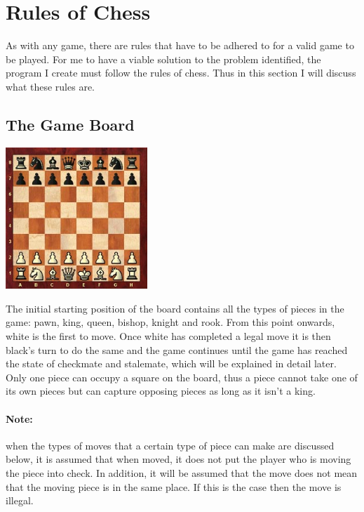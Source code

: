 \documentclass[]{report}
\begin{document}
\section{Rules of Chess}
As with any game, there are rules that have to be adhered to for a valid game to be played. For me to have a viable solution to the problem identified, the program I create must follow the rules of chess. Thus in this section I will discuss what these rules are.
\subsection{The Game Board}
\begin{center}
	\includegraphics[width=0.4\textwidth]{images/boards/initial_board}
\end{center}
The initial starting position of the board contains all the types of pieces in the game: pawn, king, queen, bishop, knight and rook. From this point onwards, white is the first to move. Once white has completed a legal move it is then black’s turn to do the same and the game continues until the game has reached the state of checkmate and stalemate, which will be explained in detail later. Only one piece can occupy a square on the board, thus a piece cannot take one of its own pieces but can capture opposing pieces as long as it isn’t a king.

\paragraph{Note:}when the types of moves that a certain type of piece can make are discussed below, it is assumed that when moved, it does not put the player who is moving the piece into check. In addition, it will be assumed that the move does not mean that the moving piece is in the same place. If this is the case then the move is illegal.
\end{document}
